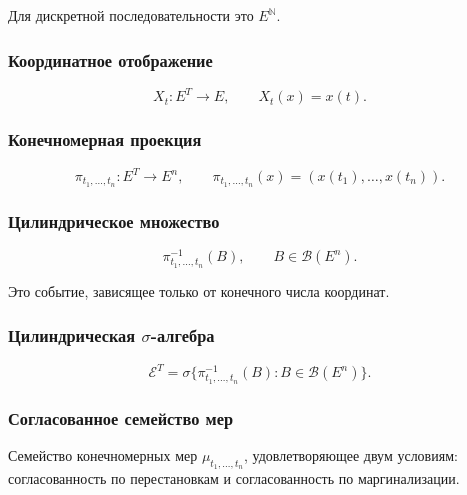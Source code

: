 \documentclass[
  11pt,
  a4paper,
]{article}
\begin{document}
Для дискретной последовательности это \(E^{\mathbb N}\).

\subsubsection{Координатное
отображение}\label{ux43aux43eux43eux440ux434ux438ux43dux430ux442ux43dux43eux435-ux43eux442ux43eux431ux440ux430ux436ux435ux43dux438ux435}

\[
X_t:E^T\to E,
\qquad
X_t(x)=x(t).
\]

\subsubsection{Конечномерная
проекция}\label{ux43aux43eux43dux435ux447ux43dux43eux43cux435ux440ux43dux430ux44f-ux43fux440ux43eux435ux43aux446ux438ux44f}

\[
\pi_{t_1,\ldots,t_n}:E^T\to E^n,
\qquad
\pi_{t_1,\ldots,t_n}(x)=(x(t_1),\ldots,x(t_n)).
\]

\subsubsection{Цилиндрическое
множество}\label{ux446ux438ux43bux438ux43dux434ux440ux438ux447ux435ux441ux43aux43eux435-ux43cux43dux43eux436ux435ux441ux442ux432ux43e}

\[
\pi_{t_1,\ldots,t_n}^{-1}(B),
\qquad
B\in\mathcal B(E^n).
\]

Это событие, зависящее только от конечного числа координат.

\subsubsection{\texorpdfstring{Цилиндрическая
\(\sigma\)-алгебра}{Цилиндрическая \textbackslash sigma-алгебра}}\label{ux446ux438ux43bux438ux43dux434ux440ux438ux447ux435ux441ux43aux430ux44f-sigma-ux430ux43bux433ux435ux431ux440ux430}

\[
\mathcal E^T
=
\sigma\{\pi_{t_1,\ldots,t_n}^{-1}(B):
B\in\mathcal B(E^n)\}.
\]

\subsubsection{Согласованное семейство
мер}\label{ux441ux43eux433ux43bux430ux441ux43eux432ux430ux43dux43dux43eux435-ux441ux435ux43cux435ux439ux441ux442ux432ux43e-ux43cux435ux440}

Семейство конечномерных мер \(\mu_{t_1,\ldots,t_n}\), удовлетворяющее
двум условиям: согласованность по перестановкам и согласованность по
маргинализации.
\end{document}

